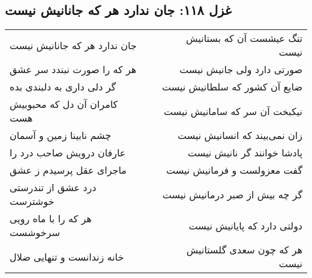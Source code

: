 \begin{center}
\section*{غزل ۱۱۸: جان ندارد هر که جانانیش نیست}
\label{sec:118}
\begin{longtable}{l p{0.5cm} r}
جان ندارد هر که جانانیش نیست
&&
تنگ عیشست آن که بستانیش نیست
\\
هر که را صورت نبندد سر عشق
&&
صورتی دارد ولی جانیش نیست
\\
گر دلی داری به دلبندی بده
&&
ضایع آن کشور که سلطانیش نیست
\\
کامران آن دل که محبوبیش هست
&&
نیکبخت آن سر که سامانیش نیست
\\
چشم نابینا زمین و آسمان
&&
زان نمی‌بیند که انسانیش نیست
\\
عارفان درویش صاحب درد را
&&
پادشا خوانند گر نانیش نیست
\\
ماجرای عقل پرسیدم ز عشق
&&
گفت معزولست و فرمانیش نیست
\\
درد عشق از تندرستی خوشترست
&&
گر چه بیش از صبر درمانیش نیست
\\
هر که را با ماه رویی سرخوشست
&&
دولتی دارد که پایانیش نیست
\\
خانه زندانست و تنهایی ضلال
&&
هر که چون سعدی گلستانیش نیست
\\
\end{longtable}
\end{center}
